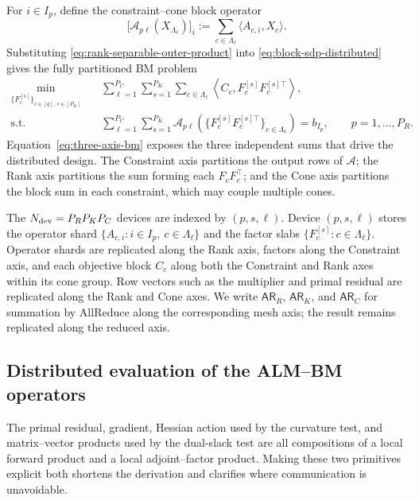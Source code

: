 \documentclass[11pt]{article}
\theoremstyle{definition}
\theoremstyle{remark}
\begin{document}
For $i\in I_p$, define the constraint--cone block operator
\begin{equation}
    \bigl[\mathcal A_{p\ell}(X_{\Lambda_\ell})\bigr]_i
    :=\sum_{c\in\Lambda_\ell}\langle A_{c,i},X_c\rangle.
\label{eq:block-operator-p-ell}
\end{equation}
Substituting \eqref{eq:rank-separable-outer-product} into
\eqref{eq:block-sdp-distributed} gives the fully partitioned BM problem
\begin{equation}
\begin{aligned}
    \min_{\{F_c^{[s]}\}_{c\in[q],\,s\in[P_K]}}\quad
    &\sum_{\ell=1}^{P_C}\sum_{s=1}^{P_K}
      \sum_{c\in\Lambda_\ell}
      \left\langle C_c,F_c^{[s]}F_c^{[s]\top}\right\rangle,\\
    \text{s.t.}\quad
    &\sum_{\ell=1}^{P_C}\sum_{s=1}^{P_K}
      \mathcal A_{p\ell}
      \left(\{F_c^{[s]}F_c^{[s]\top}\}_{c\in\Lambda_\ell}\right)
      =b_{I_p},
      \qquad p=1,\ldots,P_R.
\end{aligned}
\label{eq:three-axis-bm}
\end{equation}
Equation~\eqref{eq:three-axis-bm} exposes the three independent sums that
drive the distributed design.  The Constraint axis partitions the output
rows of $\mathcal A$; the Rank axis partitions the sum forming each
$F_cF_c^\top$; and the Cone axis partitions the block sum in each constraint,
which may couple multiple cones.

The $N_{\rm dev}=P_RP_KP_C$ devices are indexed by $(p,s,\ell)$.  Device
$(p,s,\ell)$ stores the operator shard
$\{A_{c,i}:i\in I_p,\ c\in\Lambda_\ell\}$ and the factor slabs
$\{F_c^{[s]}:c\in\Lambda_\ell\}$.  Operator shards are replicated along the
Rank axis, factors along the Constraint axis, and each objective block $C_c$
along both the Constraint and Rank axes within its cone group.  Row vectors
such as the multiplier and primal residual are replicated along the Rank and
Cone axes.  We write
$\mathsf{AR}_{R}$, $\mathsf{AR}_{K}$, and $\mathsf{AR}_{C}$ for summation by
AllReduce along the corresponding mesh axis; the result remains replicated
along the reduced axis.

\subsection{Distributed evaluation of the ALM--BM operators}
\label{subsec:distributed-operators}

The primal residual, gradient, Hessian action used by the curvature test,
and matrix--vector products used by the dual-slack test are all compositions
of a local forward product and a local adjoint--factor product.
Making these two primitives explicit both shortens the derivation and
clarifies where communication is unavoidable.
\end{document}
